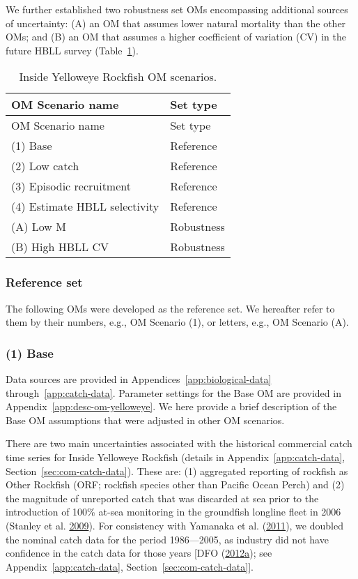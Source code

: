 \documentclass[11pt]{book}
\begin{document}
We further established two robustness set OMs encompassing additional sources of uncertainty: (A) an OM that assumes lower natural mortality than the other OMs; and (B) an OM that assumes a higher coefficient of variation (CV) in the future HBLL survey (Table~\ref{tab:ye-scen}).
\begin{longtable}[]{@{}ll@{}}
\caption{\label{tab:ye-scen}Inside Yelloweye Rockfish OM scenarios.}\tabularnewline
\toprule
OM Scenario name & Set type\tabularnewline
\midrule
\endfirsthead
\toprule
OM Scenario name & Set type\tabularnewline
\midrule
\endhead
(1) Base & Reference\tabularnewline
(2) Low catch & Reference\tabularnewline
(3) Episodic recruitment & Reference\tabularnewline
(4) Estimate HBLL selectivity & Reference\tabularnewline
(A) Low M & Robustness\tabularnewline
(B) High HBLL CV & Robustness\tabularnewline
\bottomrule
\end{longtable}
\hypertarget{sec:approach3-reference}{%
\subsubsection{Reference set}\label{sec:approach3-reference}}

The following OMs were developed as the reference set. We hereafter refer to them by their numbers, e.g., OM Scenario (1), or letters, e.g., OM Scenario (A).

\hypertarget{sec:approach3-reference1}{%
\subsubsection{(1) Base}\label{sec:approach3-reference1}}

Data sources are provided in Appendices~\ref{app:biological-data} through~\ref{app:catch-data}. Parameter settings for the Base OM are provided in Appendix~\ref{app:desc-om-yelloweye}. We here provide a brief description of the Base OM assumptions that were adjusted in other OM scenarios.

There are two main uncertainties associated with the historical commercial catch time series for Inside Yelloweye Rockfish (details in Appendix~\ref{app:catch-data}, Section~\ref{sec:com-catch-data}). These are: (1) aggregated reporting of rockfish as Other Rockfish (ORF; rockfish species other than Pacific Ocean Perch) and (2) the magnitude of unreported catch that was discarded at sea prior to the introduction of 100\% at-sea monitoring in the groundfish longline fleet in 2006 (Stanley et al. \protect\hyperlink{ref-stanley2009}{2009}). For consistency with Yamanaka et al. (\protect\hyperlink{ref-yamanaka2011}{2011}), we doubled the nominal catch data for the period 1986---2005, as industry did not have confidence in the catch data for those years {[}DFO (\protect\hyperlink{ref-dfo2012}{2012}\protect\hyperlink{ref-dfo2012}{a}); see Appendix~\ref{app:catch-data}, Section~\ref{sec:com-catch-data}{]}.
\end{document}
